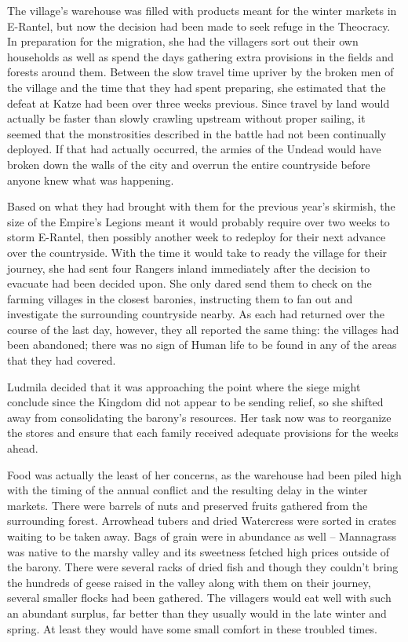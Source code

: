  

The village’s warehouse was filled with products meant for the winter markets in E-Rantel, but now the decision had been made to seek refuge in the Theocracy. In preparation for the migration, she had the villagers sort out their own households as well as spend the days gathering extra provisions in the fields and forests around them. Between the slow travel time upriver by the broken men of the village and the time that they had spent preparing, she estimated that the defeat at Katze had been over three weeks previous. Since travel by land would actually be faster than slowly crawling upstream without proper sailing, it seemed that the monstrosities described in the battle had not been continually deployed. If that had actually occurred, the armies of the Undead would have broken down the walls of the city and overrun the entire countryside before anyone knew what was happening.

 

Based on what they had brought with them for the previous year’s skirmish, the size of the Empire’s Legions meant it would probably require over two weeks to storm E-Rantel, then possibly another week to redeploy for their next advance over the countryside. With the time it would take to ready the village for their journey, she had sent four Rangers inland immediately after the decision to evacuate had been decided upon. She only dared send them to check on the farming villages in the closest baronies, instructing them to fan out and investigate the surrounding countryside nearby. As each had returned over the course of the last day, however, they all reported the same thing: the villages had been abandoned; there was no sign of Human life to be found in any of the areas that they had covered.

 

Ludmila decided that it was approaching the point where the siege might conclude since the Kingdom did not appear to be sending relief, so she shifted away from consolidating the barony’s resources. Her task now was to reorganize the stores and ensure that each family received adequate provisions for the weeks ahead.

 

Food was actually the least of her concerns, as the warehouse had been piled high with the timing of the annual conflict and the resulting delay in the winter markets. There were barrels of nuts and preserved fruits gathered from the surrounding forest. Arrowhead tubers and dried Watercress were sorted in crates waiting to be taken away. Bags of grain were in abundance as well – Mannagrass was native to the marshy valley and its sweetness fetched high prices outside of the barony. There were several racks of dried fish and though they couldn’t bring the hundreds of geese raised in the valley along with them on their journey, several smaller flocks had been gathered. The villagers would eat well with such an abundant surplus, far better than they usually would in the late winter and spring. At least they would have some small comfort in these troubled times.

